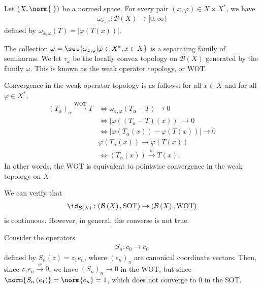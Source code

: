 \documentclass[10pt]{mypackage}
\begin{document}
\begin{example}
  Let $\left(X,\norm{\cdot}\right)$ be a normed space. For every pair $\left(x,\varphi\right)\in X\times X^{\ast}$, we have
  \begin{align*}
    \omega_{x,\varphi}: \mathcal{B}\left(X\right)\rightarrow [0,\infty)
  \end{align*}
  defined by $\omega_{x,\varphi}\left(T\right) = \left\vert \varphi\left(T(x)\right) \right\vert$.\newline

  The collection $\omega = \set{\omega_{x,\varphi} | \varphi\in X^{\ast},x\in X}$ is a separating family of seminorms. We let $\tau_{\omega}$ be the locally convex topology on $\mathcal{B}\left(X\right)$ generated by the family $\omega$. This is known as the weak operator topology, or WOT.\newline

  Convergence in the weak operator topology is as follows: for all $x\in X$ and for all $\varphi\in X^{\ast}$,
  \begin{align*}
    \left(T_{\alpha}\right)_{\alpha}\xrightarrow{\text{WOT}} T &\Leftrightarrow \omega_{x,\varphi}\left(T_{\alpha} - T\right) \rightarrow 0\\
                                                               &\Leftrightarrow \left\vert \varphi\left(\left(T_{\alpha} - T\right)\left(x\right)\right) \right\vert\rightarrow 0\\
                                                               &\Leftrightarrow \left\vert \varphi\left(T_{\alpha}\left(x\right)\right) - \varphi\left(T\left(x\right)\right) \right\vert\rightarrow 0\\
                                                               & \varphi\left(T_{\alpha}\left(x\right)\right) \rightarrow \varphi\left(T\left(x\right)\right)\\
                                                               &\Leftrightarrow \left(T_{\alpha}\left(x\right)\right)\xrightarrow{w}T\left(x\right).
  \end{align*}
  In other words, the WOT is equivalent to pointwise convergence in the weak topology on $X$.\newline

  We can verify that
  \begin{align*}
    \id_{\mathcal{B}\left(X\right)}: \left(\mathcal{B}\left(X\right),\text{SOT}\right) \rightarrow \left(\mathcal{B}\left(X\right),\text{WOT}\right)
  \end{align*}
  is continuous. However, in general, the converse is not true.\newline

  Consider the operators
  \begin{align*}
    S_n: c_0 \rightarrow c_0
  \end{align*}
  defined by $S_n(z) = z_1e_n$, where $\left(e_n\right)_n$ are canonical coordinate vectors. Then, since $z_1e_n\xrightarrow{w} 0$, we have $\left(S_n\right)_n\rightarrow 0$ in the WOT, but since $\norm{S_n\left(e_1\right)} = \norm{e_n} = 1$, which does not converge to $0$ in the SOT.
\end{example}
\end{document}
